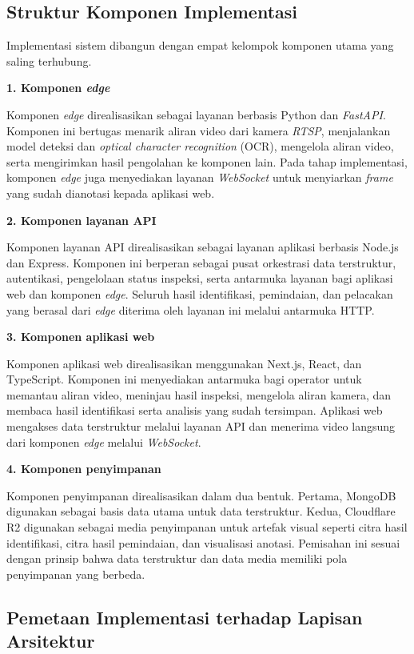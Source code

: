 \subsection{Struktur Komponen Implementasi}
\label{subsec:struktur-komponen-implementasi}

Implementasi sistem dibangun dengan empat kelompok komponen utama yang saling
terhubung.

\textbf{1. Komponen \textit{edge}}

Komponen \textit{edge} direalisasikan sebagai layanan berbasis Python dan
\textit{FastAPI}. Komponen ini bertugas menarik aliran video dari kamera
\textit{RTSP}, menjalankan model deteksi dan \textit{optical character
recognition} (OCR), mengelola aliran video, serta mengirimkan hasil pengolahan
ke komponen lain. Pada tahap implementasi, komponen \textit{edge} juga
menyediakan layanan \textit{WebSocket} untuk menyiarkan \textit{frame} yang
sudah dianotasi kepada aplikasi web.

\textbf{2. Komponen layanan API}

Komponen layanan API direalisasikan sebagai layanan aplikasi berbasis
Node.js dan Express. Komponen ini berperan sebagai pusat orkestrasi data
terstruktur, autentikasi, pengelolaan status inspeksi, serta antarmuka layanan
bagi aplikasi web dan komponen \textit{edge}. Seluruh hasil identifikasi,
pemindaian, dan pelacakan yang berasal dari \textit{edge} diterima oleh layanan
ini melalui antarmuka HTTP.

\textbf{3. Komponen aplikasi web}

Komponen aplikasi web direalisasikan menggunakan Next.js, React, dan TypeScript.
Komponen ini menyediakan antarmuka bagi operator untuk memantau aliran video,
meninjau hasil inspeksi, mengelola aliran kamera, dan membaca hasil identifikasi
serta analisis yang sudah tersimpan. Aplikasi web mengakses data terstruktur
melalui layanan API dan menerima video langsung dari komponen \textit{edge}
melalui \textit{WebSocket}.

\textbf{4. Komponen penyimpanan}

Komponen penyimpanan direalisasikan dalam dua bentuk. Pertama, MongoDB digunakan
sebagai basis data utama untuk data terstruktur. Kedua, Cloudflare R2 digunakan
sebagai media penyimpanan untuk artefak visual seperti citra hasil identifikasi,
citra hasil pemindaian, dan visualisasi anotasi. Pemisahan ini sesuai dengan
prinsip bahwa data terstruktur dan data media memiliki pola penyimpanan yang
berbeda.

\subsection{Pemetaan Implementasi terhadap Lapisan Arsitektur}
\label{subsec:pemetaan-implementasi-lapisan}

